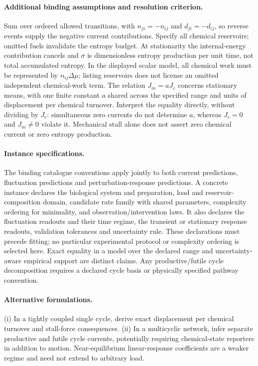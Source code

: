 \documentclass[11pt]{article}
\begin{document}
\paragraph{Additional binding assumptions and resolution criterion.} Sum over ordered allowed transitions, with $n_{ji}=-n_{ij}$ and $d_{ji}=-d_{ij}$, so reverse events supply the negative current contributions. Specify all chemical reservoirs; omitted fuels invalidate the entropy budget. At stationarity the internal-energy contribution cancels and $\sigma$ is dimensionless entropy production per unit time, not total accumulated entropy. In the displayed scalar model, all chemical work must be represented by $n_{ij}\Delta\mu$; listing reservoirs does not license an omitted independent chemical-work term. The relation $J_m=aJ_c$ concerns stationary means, with one finite constant $a$ shared across the specified range and units of displacement per chemical turnover. Interpret the equality directly, without dividing by $J_c$: simultaneous zero currents do not determine $a$, whereas $J_c=0$ and $J_m\ne0$ violate it. Mechanical stall alone does not assert zero chemical current or zero entropy production.

\paragraph{Instance specifications.} The binding catalogue conventions apply jointly to both current predictions, fluctuation predictions and perturbation-response predictions. A concrete instance declares the biological system and preparation, load and reservoir-composition domain, candidate rate family with shared parameters, complexity ordering for minimality, and observation/intervention laws. It also declares the fluctuation readouts and their time regime, the transient or stationary response readouts, validation tolerances and uncertainty rule. These declarations must precede fitting; no particular experimental protocol or complexity ordering is selected here. Exact equality in a model over the declared range and uncertainty-aware empirical support are distinct claims. Any productive/futile cycle decomposition requires a declared cycle basis or physically specified pathway convention.

\paragraph{Alternative formulations.} (i) In a tightly coupled single cycle, derive exact displacement per chemical turnover and stall-force consequences. (ii) In a multicyclic network, infer separate productive and futile cycle currents, potentially requiring chemical-state reporters in addition to motion. Near-equilibrium linear-response coefficients are a weaker regime and need not extend to arbitrary load.
\end{document}
